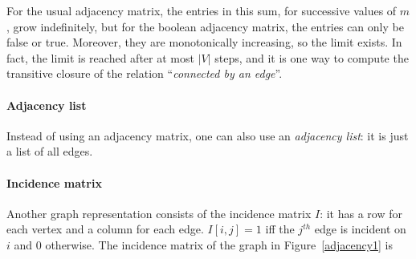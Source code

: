 For the usual adjacency matrix, the entries in this sum, for
successive values of $m$, grow indefinitely, but for the boolean
adjacency matrix, the entries can only be false or true. Moreover,
they are monotonically increasing, so the limit exists. In fact, the
limit is reached after at most $|V|$ steps, and it is one way to
compute the transitive closure of the relation ``{\em connected by an
edge}''.

\paragraph{Adjacency list} Instead of using an adjacency matrix, one can also use an {\em
adjacency list}: it is just a list of all edges.

\paragraph{Incidence matrix} Another graph representation consists of the incidence matrix $I$: it
has a row for each vertex and a column for each edge. $I[i,j] = 1$
iff the $j^{th}$ edge is incident on $i$ and 0 otherwise.  The
incidence matrix of the graph in Figure~\ref{adjacency1} is

